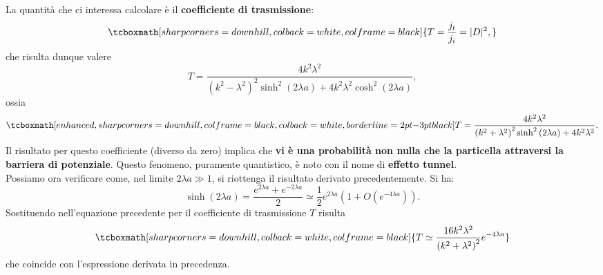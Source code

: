 La quantità che ci interessa calcolare è il \textbf{coefficiente di trasmissione}:
	\begin{equation}
		\tcboxmath[sharp corners=downhill, colback=white, colframe=black]{
			T=\frac{j_t}{j_i} =|D|^2,
			}
	\end{equation}
che risulta dunque valere
	\begin{equation}
		T=\frac{4k^2 \lambda ^2}{\left(k^2-\lambda^2\right) ^2\sinh ^2\left(2\lambda a\right)+4k^2\lambda ^2\cosh ^2\left(2\lambda a\right)},
	\end{equation}
ossia
	\begin{equation}
		\tcboxmath[enhanced, sharp corners=downhill, colframe=black, colback=white, borderline={2pt}{-3pt}{black}]{
			T=\frac{4k^2 \lambda ^2}{\left(k^2+\lambda^2\right) ^2\sinh ^2\left(2\lambda a\right)+4k^2\lambda ^2}.
			}
	\end{equation}
Il risultato per questo coefficiente (diverso da zero) implica che \textbf{vi è una probabilità non nulla che la particella attraversi la barriera di potenziale}. Questo fenomeno, puramente quantistico, è noto con il nome di \textbf{effetto tunnel}.\\

Possiamo ora verificare come, nel limite $2\lambda a \gg 1$, si riottenga il risultato derivato precedentemente. Si ha:
	\begin{equation}
		\sinh \left( 2 \lambda a \right) = \frac{e^{2\lambda a }+ e ^{-2\lambda a }}{2} \simeq \frac{1}{2} e^{2\lambda a} \left( 1+ O(e^{-4\lambda a}) \right).
\end{equation}
Sostituendo nell'equazione precedente per il coefficiente di trasmissione $T$ risulta
	\begin{equation}
		\tcboxmath[sharp corners=downhill, colback=white, colframe=black]{
		T \simeq \frac{16k^2 \lambda ^2}{\left( k^2+\lambda ^2\right) ^2}e^{-4\lambda a }}
	\end{equation}
che coincide con l'espressione derivata in precedenza.
